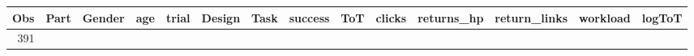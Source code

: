 \documentclass[]{svmono}
\theoremstyle{definition}
\theoremstyle{definition}
\theoremstyle{definition}
\theoremstyle{remark}
\begin{document}
\begin{longtable}[]{@{}rrlrrlllrrrrrr@{}}
\toprule
\begin{minipage}[b]{0.02\columnwidth}\raggedleft\strut
Obs\strut
\end{minipage} & \begin{minipage}[b]{0.03\columnwidth}\raggedleft\strut
Part\strut
\end{minipage} & \begin{minipage}[b]{0.03\columnwidth}\raggedright\strut
Gender\strut
\end{minipage} & \begin{minipage}[b]{0.02\columnwidth}\raggedleft\strut
age\strut
\end{minipage} & \begin{minipage}[b]{0.03\columnwidth}\raggedleft\strut
trial\strut
\end{minipage} & \begin{minipage}[b]{0.09\columnwidth}\raggedright\strut
Design\strut
\end{minipage} & \begin{minipage}[b]{0.14\columnwidth}\raggedright\strut
Task\strut
\end{minipage} & \begin{minipage}[b]{0.04\columnwidth}\raggedright\strut
success\strut
\end{minipage} & \begin{minipage}[b]{0.02\columnwidth}\raggedleft\strut
ToT\strut
\end{minipage} & \begin{minipage}[b]{0.03\columnwidth}\raggedleft\strut
clicks\strut
\end{minipage} & \begin{minipage}[b]{0.05\columnwidth}\raggedleft\strut
returns\_hp\strut
\end{minipage} & \begin{minipage}[b]{0.06\columnwidth}\raggedleft\strut
return\_links\strut
\end{minipage} & \begin{minipage}[b]{0.04\columnwidth}\raggedleft\strut
workload\strut
\end{minipage} & \begin{minipage}[b]{0.03\columnwidth}\raggedleft\strut
logToT\strut
\end{minipage}\tabularnewline
\midrule
\endhead
\begin{minipage}[t]{0.02\columnwidth}\raggedleft\strut
391\strut
\end{minipage} & \begin{minipage}[t]{0.03\columnwidth}\raggedleft\strut

\end{minipage}
\end{longtable}
\end{document}
